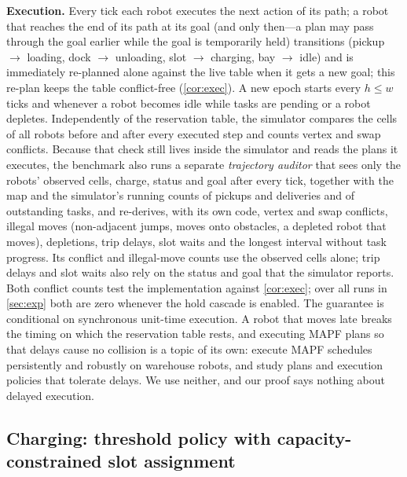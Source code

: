 \noindent\textbf{Execution.}
Every tick each robot executes the next action of its path; a robot that
reaches the end of its path at its goal (and only then---a plan may pass
through the goal earlier while the goal is temporarily held) transitions
(pickup $\to$ loading, dock $\to$ unloading, slot $\to$ charging, bay $\to$
idle) and is immediately re-planned alone against the live table when it
gets a new goal; this re-plan keeps the table conflict-free
(\cref{cor:exec}). A new epoch starts every $h\le w$ ticks and whenever a
robot becomes idle while tasks are pending or a robot depletes. Independently
of the reservation table, the simulator compares the cells of all robots
before and after every executed step and counts vertex and swap conflicts.
Because that check still lives inside the simulator and reads the plans it
executes, the benchmark also runs a separate \emph{trajectory auditor} that
sees only the robots' observed cells, charge, status and goal after every
tick, together with the map and the simulator's running counts of pickups
and deliveries and of outstanding tasks,
and re-derives, with its own code, vertex and swap conflicts, illegal
moves (non-adjacent jumps, moves onto obstacles, a depleted robot that
moves), depletions, trip delays, slot waits and the longest interval without
task progress. Its conflict and illegal-move counts use the observed cells
alone; trip delays and slot waits also rely on the status and goal that the
simulator reports. Both conflict counts test the implementation against
\cref{cor:exec}; over all runs in \cref{sec:exp} both are zero whenever the
hold cascade is enabled. The guarantee is conditional on synchronous
unit-time execution. A robot that moves late breaks the timing on which the
reservation table rests, and executing MAPF plans so that delays cause no
collision is a topic of its own: \citet{honig2019persistent} execute MAPF
schedules persistently and robustly on warehouse robots, and
\citet{atzmon2020robust} study plans and execution policies that tolerate
delays. We use neither, and our proof says nothing about delayed execution.

\subsection{Charging: threshold policy with capacity-constrained slot assignment}\label{subsec:charging}

